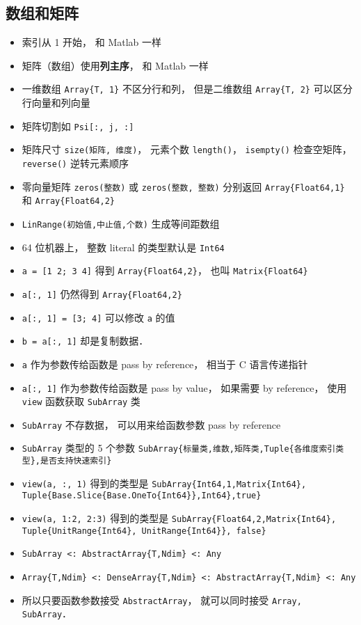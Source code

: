 \subsection{数组和矩阵}
\begin{itemize}
\item 索引从 1 开始， 和 Matlab 一样
\item 矩阵（数组）使用\textbf{列主序}， 和 Matlab 一样
\item 一维数组 \verb|Array{T, 1}| 不区分行和列， 但是二维数组 \verb|Array{T, 2}| 可以区分行向量和列向量
\item 矩阵切割如 \verb|Psi[:, j, :]|
\item 矩阵尺寸 \verb|size(矩阵, 维度)|， 元素个数 \verb|length()|， \verb|isempty()| 检查空矩阵， \verb|reverse()| 逆转元素顺序
\item 零向量矩阵 \verb|zeros(整数)| 或 \verb|zeros(整数, 整数)| 分别返回 \verb|Array{Float64,1}| 和 \verb|Array{Float64,2}|
\item \verb|LinRange(初始值,中止值,个数)| 生成等间距数组
\item 64 位机器上， 整数 literal 的类型默认是 \verb|Int64|
\item \verb|a = [1 2; 3 4]| 得到 \verb|Array{Float64,2}|， 也叫 \verb|Matrix{Float64}|
\item \verb|a[:, 1]| 仍然得到 \verb|Array{Float64,2}|
\item \verb|a[:, 1] = [3; 4]| 可以修改 \verb|a| 的值
\item \verb|b = a[:, 1]| 却是复制数据．
\item \verb|a| 作为参数传给函数是 pass by reference， 相当于 C 语言传递指针
\item \verb|a[:, 1]| 作为参数传给函数是 pass by value， 如果需要 by reference， 使用 \verb|view| 函数获取 \verb|SubArray| 类
\item \verb|SubArray| 不存数据， 可以用来给函数参数 pass by reference
\item \verb|SubArray| 类型的 5 个参数 \verb|SubArray{标量类,维数,矩阵类,Tuple{各维度索引类型},是否支持快速索引}|
\item \verb|view(a, :, 1)| 得到的类型是 \verb|SubArray{Int64,1,Matrix{Int64}, Tuple{Base.Slice{Base.OneTo{Int64}},Int64},true}|
\item \verb|view(a, 1:2, 2:3)| 得到的类型是 \verb|SubArray{Float64,2,Matrix{Int64}, Tuple{UnitRange{Int64}, UnitRange{Int64}}, false}|
\item \verb|SubArray <: AbstractArray{T,Ndim} <: Any|
\item \verb|Array{T,Ndim} <: DenseArray{T,Ndim} <: AbstractArray{T,Ndim} <: Any|
\item 所以只要函数参数接受 \verb|AbstractArray|， 就可以同时接受 \verb|Array, SubArray|．
\end{itemize}

